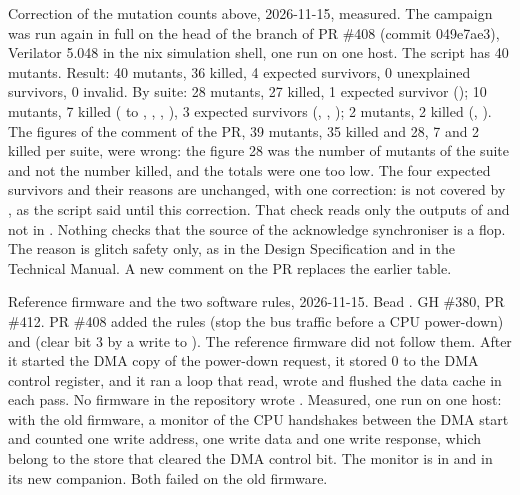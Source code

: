 \begin{record}

Correction of the mutation counts above, 2026-11-15, measured. The campaign was run again in full on the head of the branch of PR \#408 (commit 049e7ae3), Verilator 5.048 in the nix simulation shell, one run on one host. The script  has 40 mutants. Result: 40 mutants, 36 killed, 4 expected survivors, 0 unexplained survivors, 0 invalid. By suite:  28 mutants, 27 killed, 1 expected survivor ();  10 mutants, 7 killed ( to , , , ), 3 expected survivors (, , );  2 mutants, 2 killed (, ). The figures of the comment of the PR, 39 mutants, 35 killed and 28, 7 and 2 killed per suite, were wrong: the figure 28 was the number of mutants of the suite  and not the number killed, and the totals were one too low. The four expected survivors and their reasons are unchanged, with one correction:  is not covered by , as the script said until this correction. That check reads only the outputs of  and not  in . Nothing checks that the source of the acknowledge synchroniser is a flop. The reason is glitch safety only, as in the Design Specification and in the Technical Manual. A new comment on the PR replaces the earlier table.

\end{record}

\begin{record}

Reference firmware and the two software rules, 2026-11-15. Bead . GH \#380, PR \#412. PR \#408 added the rules  (stop the bus traffic before a CPU power-down) and  (clear  bit 3 by a write to ). The reference firmware  did not follow them. After it started the DMA copy of the power-down request, it stored 0 to the DMA control register, and it ran a loop that read, wrote and flushed the data cache in each pass. No firmware in the repository wrote . Measured, one run on one host: with the old firmware, a monitor of the CPU handshakes between the DMA start and  counted one write address, one write data and one write response, which belong to the store that cleared the DMA control bit. The monitor is in  and in its new companion. Both failed on the old firmware.

\end{record}

